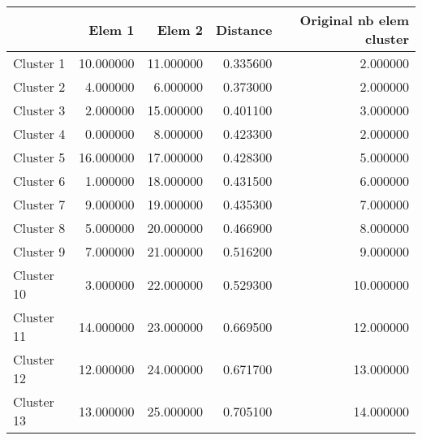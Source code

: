 \begin{tabular}{lrrrr}
\toprule
 & Elem 1 & Elem 2 & Distance & Original nb elem cluster \\
\midrule
Cluster 1 & 10.000000 & 11.000000 & 0.335600 & 2.000000 \\
Cluster 2 & 4.000000 & 6.000000 & 0.373000 & 2.000000 \\
Cluster 3 & 2.000000 & 15.000000 & 0.401100 & 3.000000 \\
Cluster 4 & 0.000000 & 8.000000 & 0.423300 & 2.000000 \\
Cluster 5 & 16.000000 & 17.000000 & 0.428300 & 5.000000 \\
Cluster 6 & 1.000000 & 18.000000 & 0.431500 & 6.000000 \\
Cluster 7 & 9.000000 & 19.000000 & 0.435300 & 7.000000 \\
Cluster 8 & 5.000000 & 20.000000 & 0.466900 & 8.000000 \\
Cluster 9 & 7.000000 & 21.000000 & 0.516200 & 9.000000 \\
Cluster 10 & 3.000000 & 22.000000 & 0.529300 & 10.000000 \\
Cluster 11 & 14.000000 & 23.000000 & 0.669500 & 12.000000 \\
Cluster 12 & 12.000000 & 24.000000 & 0.671700 & 13.000000 \\
Cluster 13 & 13.000000 & 25.000000 & 0.705100 & 14.000000 \\
\bottomrule
\end{tabular}
